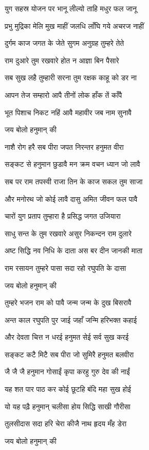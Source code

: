 \begin{large}
\begin{multicols}{2}
\twolineshloka
{युग सहस्र योजन पर भानू}
{लील्यो ताहि मधुर फल जानू}

\twolineshloka
{प्रभु मुद्रिका मेलि मुख माहीं}
{जलधि लाँघि गये अचरज नाहीं}

\twolineshloka
{दुर्गम काज जगत के जेते}
{सुगम अनुग्रह तुम्हरे तेते}

\twolineshloka
{राम दुआरे तुम रखवारे}
{होत न आज्ञा बिन पैसारे}

\twolineshloka
{सब सुख लहै तुम्हारी सरना}
{तुम रक्षक काहू को डर ना}

\twolineshloka
{आपन तेज सम्हारो आपै}
{तीनों लोक हाँक तें काँपै}

\twolineshloka
{भूत पिशाच निकट नहिं आवै}
{महावीर जब नाम सुनावै}

{जय बोलो हनुमान् की}

\twolineshloka
{नाशै रोग हरै सब पीरा}
{जपत निरन्तर हनुमत वीरा}

\twolineshloka
{सङ्कट से हनुमान छुडावै}
{मन क्रम वचन ध्यान जो लावै}

\twolineshloka
{सब पर राम तपस्वी राजा}
{तिन के काज सकल तुम साजा}

\twolineshloka
{और मनोरथ जो कोई लावै}
{दासु अमित जीवन फल पावै}

\twolineshloka
{चारों युग प्रताप तुम्हारा}
{है प्रसिद्ध जगत उजियारा}

\twolineshloka
{साधु सन्त के तुम रखवारे}
{असुर निकन्दन राम दुलारे}

\twolineshloka
{अष्ट सिद्धि नव निधि के दाता}
{अस बर दीन जानकी माता}

\twolineshloka
{राम रसायन तुम्हरे पासा}
{सदा रहो रघुपति के दासा}

{जय बोलो हनुमान् की}

\twolineshloka
{तुम्हरे भजन राम को पावै}
{जन्म जन्म के दुख बिसरावै}

\twolineshloka
{अन्त काल रघुपति पुर जाई}
{जहाँ जन्मि हरिभक्त कहाई}

\twolineshloka
{और देवता चित्त न धरई}
{हनुमत सेई सर्व सुख करई}

\twolineshloka
{सङ्कट कटै मिटै सब पीरा}
{जो सुमिरै हनुमत बलवीरा}

\twolineshloka
{जै जै जै हनुमान गोसाईं}
{कृपा करहु गुरु देव की नाईं}

\twolineshloka
{यह शत पार पाठ कर कोई}
{छूटहि बंदि महा सुख होई}

\twolineshloka
{यो यह पढ़ै हनुमान् चलीसा}
{होय सिद्धि साखी गौरीसा}

\twolineshloka
{तुलसीदास सदा हरि चेरा}
{कीजै नाथ हृदय मँह डेरा}

{जय बोलो हनुमान् की}
\end{multicols}
\end{large}